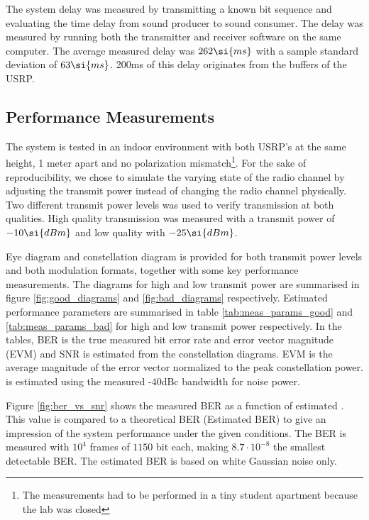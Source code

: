 The system delay was measured by transmitting a known bit sequence and evaluating the time delay from sound producer to sound consumer. The delay was measured by running both the transmitter and receiver software on the same computer. The average measured delay was $\measDelay \si{ms}$ with a sample standard deviation of $\measDelayStd \si{ms}$. 200ms of this delay originates from the buffers of the USRP.

\subsection{Performance Measurements}
\label{sec:perf_meas}
The system is tested in an indoor environment with both USRP's at the same height, 1 meter apart and no polarization mismatch\footnote{The measurements had to be performed in a tiny student apartment because the lab was closed}. For the sake of reproducibility, we chose to simulate the varying state of the radio channel by adjusting the transmit power instead of changing the radio channel physically. Two different transmit power levels was used to verify transmission at both qualities. High quality transmission was measured with a transmit power of $\measPWR \si{dBm}$ and low quality with $\measPWRbad \si{dBm}$. 

Eye diagram and constellation diagram is provided for both transmit power levels and both modulation formats, together with some key performance measurements. The diagrams for high and low transmit power are summarised in figure \ref{fig:good_diagrams} and \ref{fig:bad_diagrams} respectively. Estimated performance parameters are summarised in table \ref{tab:meas_params_good} and \ref{tab:meas_params_bad} for high and low transmit power respectively. In the tables, BER is the true measured bit error rate and error vector magnitude (EVM) and SNR is estimated from the constellation diagrams. EVM is the average magnitude of the error vector normalized to the peak constellation power. \ebnot is estimated using the measured -40dBc bandwidth for noise power.






Figure \ref{fig:ber_vs_snr} shows the measured BER as a function of estimated \ebnot. This value is compared to a theoretical BER (Estimated BER) to give an impression of the system performance under the given conditions. The BER is measured with $10^4$ frames of $1150$ bit each, making $8.7\cdot10^{-8}$ the smallest detectable BER. The estimated BER is based on white Gaussian noise only.


